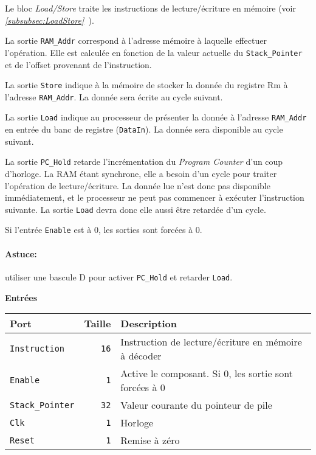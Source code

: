 
Le bloc \textit{Load/Store} traite les instructions de lecture/écriture en mémoire (voir \textit{\ref{subsubsec:LoadStore}~}).

La sortie \texttt{RAM\_Addr} correspond à l'adresse mémoire à laquelle effectuer l'opération.
Elle est calculée en fonction de la valeur actuelle du \texttt{Stack\_Pointer} et de l'offset provenant de l'instruction.

La sortie \texttt{Store} indique à la mémoire de stocker la donnée du registre Rm à l'adresse \texttt{RAM\_Addr}. La donnée sera écrite au cycle suivant.

La sortie \texttt{Load} indique au processeur de présenter la donnée à l'adresse \texttt{RAM\_Addr} en entrée du banc de registre (\texttt{DataIn}). La donnée sera disponible au cycle suivant.

La sortie \texttt{PC\_Hold} retarde l'incrémentation du \textit{Program Counter} d'un coup d'horloge. La RAM étant synchrone, elle a besoin d'un cycle pour traiter l'opération de lecture/écriture. La donnée lue n'est donc pas disponible immédiatement, et le processeur ne peut pas commencer à exécuter l'instruction suivante.
La sortie \texttt{Load} devra donc elle aussi être retardée d'un cycle.

Si l'entrée \texttt{Enable} est à 0, les sorties sont forcées à 0.

\paragraph{Astuce:} utiliser une bascule D pour activer \texttt{PC\_Hold} et retarder \texttt{Load}.


\textbf{Entrées}\\

\begin{tabular}{|l|r|l|}
\hline
\textbf{Port}		& \textbf{Taille} & \textbf{Description}\\
\hline

\texttt{Instruction}	& \texttt{16} & Instruction de lecture/écriture en mémoire à décoder\\
\hline
\texttt{Enable}		&  \texttt{1} & Active le composant. Si 0, les sortie sont forcées à 0\\
\hline
\texttt{Stack\_Pointer}	& \texttt{32} & Valeur courante du pointeur de pile\\
\hline
\texttt{Clk}		&  \texttt{1} & Horloge\\
\hline
\texttt{Reset}		&  \texttt{1} & Remise à zéro\\


\hline
\end{tabular}

